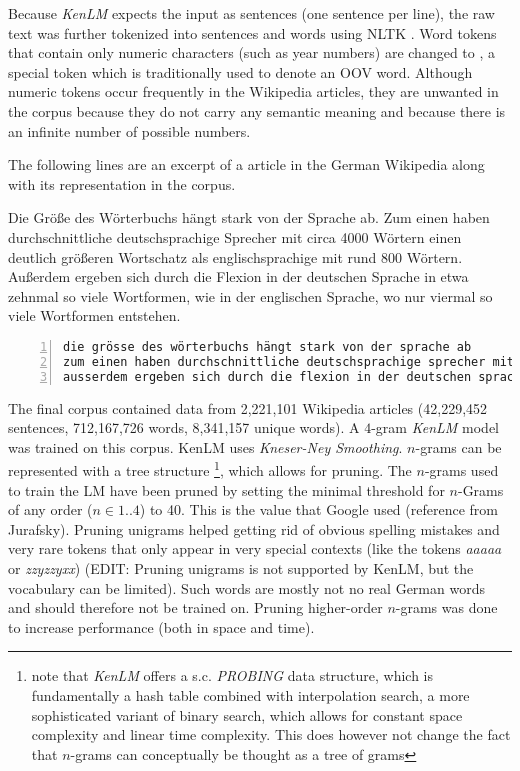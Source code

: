Because \textit{KenLM} expects the input as sentences (one sentence per line), the raw text was further tokenized into sentences and words using NLTK \parencite{nltk}. Word tokens that contain only numeric characters (such as year numbers) are changed to , a special token which is traditionally used to denote an \ac{OOV} word. Although numeric tokens occur frequently in the Wikipedia articles, they are unwanted in the corpus because they do not carry any semantic meaning and because there is an infinite number of possible numbers.

The following lines are an excerpt of a article in the German Wikipedia along with its representation in the corpus.

\begin{displayquote}
Die Größe des Wörterbuchs hängt stark von der Sprache ab. Zum einen haben durchschnittliche deutschsprachige Sprecher mit circa 4000 Wörtern einen deutlich größeren Wortschatz als englischsprachige mit rund 800 Wörtern. Außerdem ergeben sich durch die Flexion in der deutschen Sprache in etwa zehnmal so viele Wortformen, wie in der englischen Sprache, wo nur viermal so viele Wortformen entstehen.
\end{displayquote}

\begin{lstlisting}[numbers=left, caption=Representation in corpus]
die grösse des wörterbuchs hängt stark von der sprache ab
zum einen haben durchschnittliche deutschsprachige sprecher mit circa <unk> wörtern einen deutlich grösseren wortschatz als englischsprachige mit rund <unk> wörtern
ausserdem ergeben sich durch die flexion in der deutschen sprache in etwa zehnmal so viele wortformen wie in der englischen sprache wo nur viermal so viele wortformen entstehen
\end{lstlisting}

The final corpus contained data from 2,221,101 Wikipedia articles (42,229,452 sentences, 712,167,726 words, 8,341,157 unique words). A $4$-gram \textit{KenLM} model was trained on this corpus. KenLM uses \textit{Kneser-Ney Smoothing}. $n$-grams can be represented with a tree structure \footnote{note that \textit{KenLM} offers a s.c. \textit{PROBING} data structure, which is fundamentally a hash table combined with interpolation search, a more sophisticated variant of binary search, which allows for constant space complexity and linear time complexity. This does however not change the fact that $n$-grams can conceptually be thought as a tree of grams}, which allows for pruning. The $n$-grams used to train the \ac{LM} have been pruned by setting the minimal threshold for $n$-Grams of any order ($n \in 1..4$) to 40. This is the value that Google used (reference from Jurafsky). Pruning unigrams helped getting rid of obvious spelling mistakes and very rare tokens that only appear in very special contexts (like the tokens \textit{aaaaa} or \textit{zzyzzyxx}) (EDIT: Pruning unigrams is not supported by KenLM, but the vocabulary can be limited). Such words are mostly not no real German words and should therefore not be trained on. Pruning higher-order $n$-grams was done to increase performance (both in space and time).

